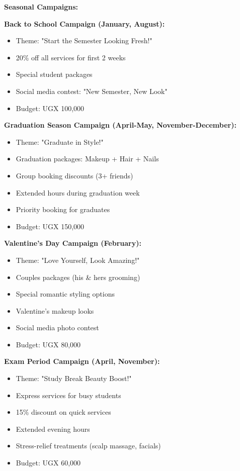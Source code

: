 \textbf{Seasonal Campaigns:}

\textbf{Back to School Campaign (January, August):}
\begin{itemize}[leftmargin=2em]
    \item Theme: "Start the Semester Looking Fresh!"
    \item 20\% off all services for first 2 weeks
    \item Special student packages
    \item Social media contest: "New Semester, New Look"
    \item Budget: UGX 100,000
\end{itemize}

\textbf{Graduation Season Campaign (April-May, November-December):}
\begin{itemize}[leftmargin=2em]
    \item Theme: "Graduate in Style!"
    \item Graduation packages: Makeup + Hair + Nails
    \item Group booking discounts (3+ friends)
    \item Extended hours during graduation week
    \item Priority booking for graduates
    \item Budget: UGX 150,000
\end{itemize}

\textbf{Valentine's Day Campaign (February):}
\begin{itemize}[leftmargin=2em]
    \item Theme: "Love Yourself, Look Amazing!"
    \item Couples packages (his \& hers grooming)
    \item Special romantic styling options
    \item Valentine's makeup looks
    \item Social media photo contest
    \item Budget: UGX 80,000
\end{itemize}

\textbf{Exam Period Campaign (April, November):}
\begin{itemize}[leftmargin=2em]
    \item Theme: "Study Break Beauty Boost!"
    \item Express services for busy students
    \item 15\% discount on quick services
    \item Extended evening hours
    \item Stress-relief treatments (scalp massage, facials)
    \item Budget: UGX 60,000
\end{itemize}

